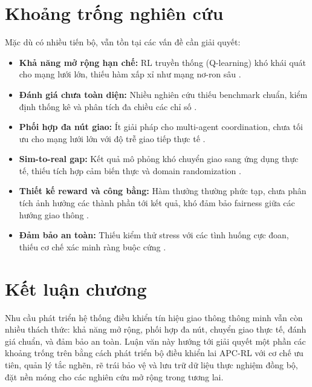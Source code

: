 \section{Khoảng trống nghiên cứu}

Mặc dù có nhiều tiến bộ, vẫn tồn tại các vấn đề cần giải quyết:
\begin{itemize}
    \item \textbf{Khả năng mở rộng hạn chế:} RL truyền thống (Q-learning) khó khái quát cho mạng lưới lớn, thiếu hàm xấp xỉ như mạng nơ-ron sâu \cite{Li2016, Liang2019}.
    \item \textbf{Đánh giá chưa toàn diện:} Nhiều nghiên cứu thiếu benchmark chuẩn, kiểm định thống kê và phân tích đa chiều các chỉ số \cite{Shaikh2022}.
    \item \textbf{Phối hợp đa nút giao:} Ít giải pháp cho multi-agent coordination, chưa tối ưu cho mạng lưới lớn với độ trễ giao tiếp thực tế \cite{Kouvelas2011}.
    \item \textbf{Sim-to-real gap:} Kết quả mô phỏng khó chuyển giao sang ứng dụng thực tế, thiếu tích hợp cảm biến thực và domain randomization \cite{Lopez2018}.
    \item \textbf{Thiết kế reward và công bằng:} Hàm thưởng thường phức tạp, chưa phân tích ảnh hưởng các thành phần tới kết quả, khó đảm bảo fairness giữa các hướng giao thông \cite{Sutton2018}.
    \item \textbf{Đảm bảo an toàn:} Thiếu kiểm thử stress với các tình huống cực đoan, thiếu cơ chế xác minh ràng buộc cứng \cite{Mirchandani2001}.
\end{itemize}

\section{Kết luận chương}

Nhu cầu phát triển hệ thống điều khiển tín hiệu giao thông thông minh vẫn còn nhiều thách thức: khả năng mở rộng, phối hợp đa nút, chuyển giao thực tế, đánh giá chuẩn, và đảm bảo an toàn. Luận văn này hướng tới giải quyết một phần các khoảng trống trên bằng cách phát triển bộ điều khiển lai APC-RL với cơ chế ưu tiên, quản lý tắc nghẽn, rẽ trái bảo vệ và lưu trữ dữ liệu thực nghiệm đồng bộ, đặt nền móng cho các nghiên cứu mở rộng trong tương lai.
